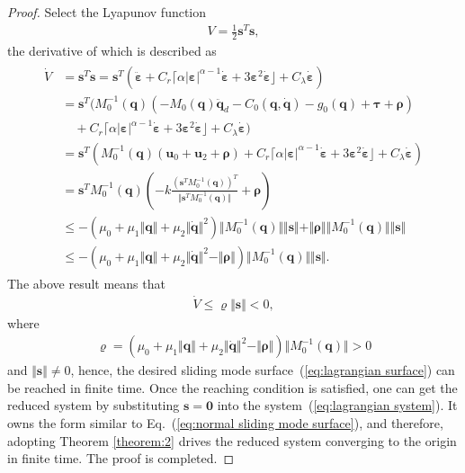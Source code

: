 \documentclass[3p]{elsarticle}
\theoremstyle{plain}
\theoremstyle{remark}
\begin{document}
\begin{proof}
Select the Lyapunov function
\begin{align}
V=\frac{1}{2}\bm s^T\bm s,
\end{align}
the derivative of which is described as
\begin{align}
\begin{split}
\dot V &= \bm s^T\dot{\bm s}=\bm s^T(\ddot{\bm \varepsilon}+C_r\lceil\alpha\vert\bm\varepsilon\vert^{\alpha-1}\dot{\bm \varepsilon}+3\bm \varepsilon^2\dot{\bm \varepsilon}\rfloor+C_\lambda\dot{\bm \varepsilon})\\
&=\bm s^T(M_0^{-1}(\bm q)(-M_0(\bm q)\ddot {\bm q}_d-C_0(\bm q,\dot {\bm q})-g_0(\bm q)+\bm\tau+\bm\rho)\\
&\quad+C_r\lceil\alpha\vert\bm\varepsilon\vert^{\alpha-1}\dot{\bm \varepsilon}+3\bm \varepsilon^2\dot{\bm \varepsilon}\rfloor+C_\lambda\dot{\bm \varepsilon})\\
&=\bm s^T(M_0^{-1}(\bm q)(\bm u_0+\bm u_2+\bm\rho)+C_r\lceil\alpha\vert\bm\varepsilon\vert^{\alpha-1}\dot{\bm \varepsilon}+3\bm \varepsilon^2\dot{\bm \varepsilon}\rfloor+C_\lambda\dot{\bm \varepsilon})\\
&=\bm s^TM_0^{-1}(\bm q)(-k\frac{(\bm s^TM_0^{-1}(\bm q))^T}{\Vert\bm s^TM_0^{-1}(\bm q)\Vert}+\bm\rho)\\
&\le -(\mu_0+\mu_1\Vert\bm q\Vert+\mu_2\Vert\dot{\bm q}\Vert^2)\Vert M_0^{-1}(\bm q)\Vert\Vert \bm s\Vert+\Vert\bm\rho\Vert\Vert M_0^{-1}(\bm q)\Vert\Vert \bm s\Vert\\
&\le -(\mu_0+\mu_1\Vert\bm q\Vert+\mu_2\Vert\dot{\bm q}\Vert^2-\Vert\bm\rho\Vert)\Vert M_0^{-1}(\bm q)\Vert\Vert \bm s\Vert.
\end{split}
\end{align}
The above result means that
\begin{align}
\dot V \le \varrho\Vert\bm s\Vert<0,
\end{align}
where
\begin{align}
\varrho=(\mu_0+\mu_1\Vert\bm q\Vert+\mu_2\Vert\dot{\bm q}\Vert^2-\Vert\bm\rho\Vert)\Vert M_0^{-1}(\bm q)\Vert>0
\end{align}
and $\Vert\bm s\Vert\neq 0$, hence, the desired sliding mode  surface~(\ref{eq:lagrangian surface}) can be reached in finite time. Once the reaching condition is satisfied, one can get the reduced system by substituting $\bm s = \bm 0$ into the system~(\ref{eq:lagrangian system}). It owns the form similar to Eq.~(\ref{eq:normal sliding mode  surface}), and therefore, adopting Theorem \ref{theorem:2} drives the reduced system converging to the origin in finite time. The proof is completed.
\end{proof}
\end{document}
